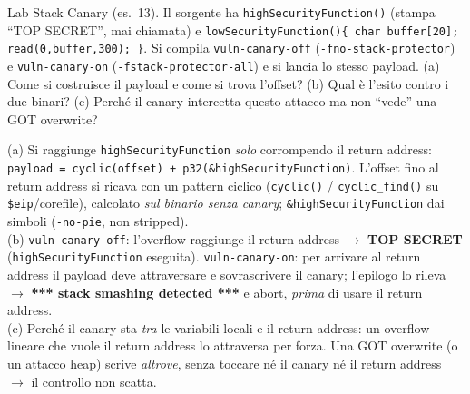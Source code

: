 \question[7]
Lab Stack Canary (es.\ 13). Il sorgente ha \lstinline|highSecurityFunction()| (stampa ``TOP SECRET'', mai chiamata) e \lstinline|lowSecurityFunction(){ char buffer[20]; read(0,buffer,300); }|. Si compila \lstinline|vuln-canary-off| (\lstinline|-fno-stack-protector|) e \lstinline|vuln-canary-on| (\lstinline|-fstack-protector-all|) e si lancia lo stesso payload.
(a) Come si costruisce il payload e come si trova l'offset? (b) Qual è l'esito contro i due binari? (c) Perché il canary intercetta questo attacco ma non ``vede'' una GOT overwrite?
\begin{solution}
(a) Si raggiunge \lstinline|highSecurityFunction| \emph{solo} corrompendo il return address: \lstinline|payload = cyclic(offset) + p32(&highSecurityFunction)|. L'offset fino al return address si ricava con un pattern ciclico (\lstinline|cyclic()| / \lstinline|cyclic_find()| su \lstinline|$eip|/corefile), calcolato \emph{sul binario senza canary}; \lstinline|&highSecurityFunction| dai simboli (\lstinline|-no-pie|, non stripped).\\
(b) \lstinline|vuln-canary-off|: l'overflow raggiunge il return address $\to$ \textbf{TOP SECRET} (\lstinline|highSecurityFunction| eseguita). \lstinline|vuln-canary-on|: per arrivare al return address il payload deve attraversare e sovrascrivere il canary; l'epilogo lo rileva $\to$ \textbf{*** stack smashing detected ***} e abort, \emph{prima} di usare il return address.\\
(c) Perché il canary sta \emph{tra} le variabili locali e il return address: un overflow lineare che vuole il return address lo attraversa per forza. Una GOT overwrite (o un attacco heap) scrive \emph{altrove}, senza toccare né il canary né il return address $\to$ il controllo non scatta.
\end{solution}
